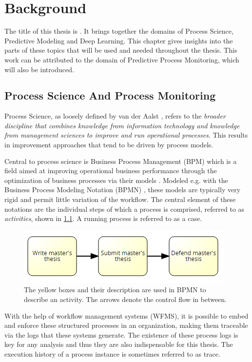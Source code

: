 \chapter{Background}\label{chap:background}
The title of this thesis is \textit{\myTitle}.
It brings together the domains of Process Science, Predictive Modeling and Deep Learning.
This chapter gives insights into the parts of these topics that will be used and needed throughout the thesis.
This work can be attributed to the domain of Predictive Process Monitoring, which will also be introduced.

\section{Process Science And Process Monitoring}
Process Science, as loosely defined by van der Aalst \cite{Aalst2016}, refers to the \textit{broader discipline that combines knowledge from information technology and knowledge from management sciences to improve and run operational processes}. This results in improvement approaches that tend to be driven by process models.

Central to process science is Business Process Management (BPM) which is a field aimed at improving operational business performance through the optimization of business processes via their models \cite{panagacos2012ultimate}.
Modeled e.g. with the Business Process Modeling Notation (BPMN) \cite{bpmn2.0}, these models are typically very rigid and permit little variation of the workflow. The central element of these notations are the individual steps of which a process is comprised, referred to as \textit{activities}, shown in \ref{fig:activity-introduction}. A running process is referred to as a case.

\begin{figure}
    \centering
    \includegraphics[width=.75\textwidth]{gfx/activity-introduction.png}
    \caption{The yellow boxes and their description are used in BPMN to describe an activity. The arrows denote the control flow in between.}
    \label{fig:activity-introduction}
\end{figure}

With the help of workflow management systems (WFMS), it is possible to embed and enforce these structured processes in an organization, making them traceable via the logs that these systems generate. The existence of these process logs is key for any analysis and thus they are also indispensable for this thesis. The execution history of a process instance is sometimes referred to as trace.

